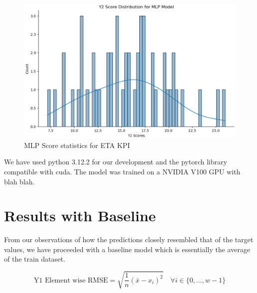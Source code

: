 \documentclass{report} %
\begin{document}
\begin{figure}[H]
    \centering
    \includegraphics[width=1\textwidth]{./ReportImages/score_mlp_y2.png} 
    \caption{MLP Score statistics for ETA \ac{KPI}} 
    \label{fig:MLP Score statistics for 3D KPI(ETA)}
\end{figure}


We have used python 3.12.2 for our development and the pytorch library compatible with cuda.
The model was trained on a NVIDIA V100 GPU with blah blah.\\


\section{Results with Baseline}\label{sec:Results with Baseline}

From our observations of how the predictions closely resembled that of the target values, we have proceeded with a baseline model which is essentially the average of the train dataset.

\begin{equation}
    \text{Y1 Element wise RMSE} = \sqrt{\frac{1}{n} (\bar{x} - x_{i})^2} \quad \forall i \in \{0, \dots, w-1\}
    \label{eq:Y1 Element wise RMSE}
\end{equation}

\end{document}
